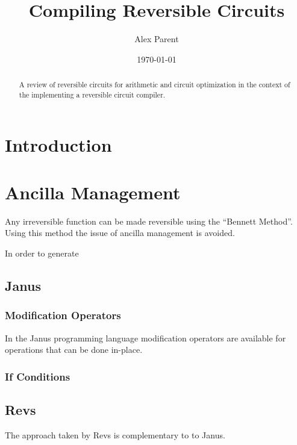 \documentclass{report}
\begin{document}
\listoftodos 

\title{Compiling Reversible Circuits}
\author{Alex Parent}
\date{\today}
\maketitle

\begin{abstract}
  A review of reversible circuits for arithmetic and circuit optimization in the context of the implementing a reversible circuit compiler.
\end{abstract}
\tableofcontents

\chapter{Introduction}


\chapter{Ancilla Management}

Any irreversible function can be made reversible using the ``Bennett Method''\cite{Bennett:73}.
Using this method the issue of ancilla management is avoided.

In order to generate 

\section{Janus}
\subsection{Modification Operators}
In the Janus programming language\cite{YG:2007} modification operators are available for operations that can be done in-place.
\subsection{If Conditions}

\section{Revs}
The approach taken by Revs is complementary to to Janus.







\end{document}
